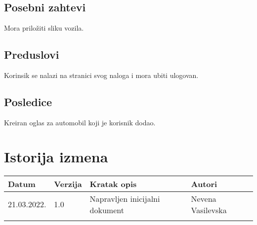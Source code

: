 \documentclass[12pt]{article}
\begin{document}
\subsection{Posebni zahtevi}
Mora priložiti sliku vozila.
\subsection{Preduslovi}
Korinsik se nalazi na stranici svog naloga i mora ubiti ulogovan.
\subsection{Posledice}
Kreiran oglas za automobil koji je korisnik dodao.

\section{Istorija izmena}
\begin{center}
\begin{tabular}{ | m{2cm} | m{1.5cm}| m{6cm} | m{5cm} | } 
\hline
Datum & Verzija & Kratak opis & Autori \\ 
\hline
 21.03.2022. & 1.0 & Napravljen inicijalni dokument & Nevena Vasilevska\\ 
\hline
&&&\\ 
\hline
\end{tabular}
\end{center}
\end{document}
